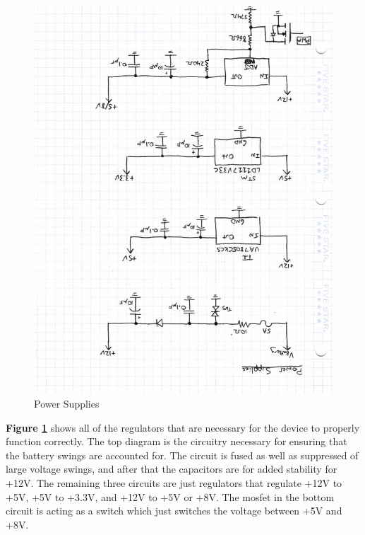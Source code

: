\documentclass[12pt,letterpaper]{article}
\begin{document}
\begin{figure}[H]
\centering
\includegraphics[page=1, totalheight=20cm, angle=180]{images/circuit_sch.pdf}
\caption{Power Supplies}
\label{fig:ps}
\end{figure}

\textbf{Figure \ref{fig:ps}} shows all of the regulators that are necessary for the device to properly function correctly. The top diagram is the circuitry necessary for ensuring that the battery swings are accounted for. The circuit is fused as well as suppressed of large voltage swings, and after that the capacitors are for added stability for +12V. The remaining three circuits are just regulators that regulate +12V to +5V, +5V to +3.3V, and +12V to +5V or +8V. The mosfet in the bottom circuit is acting as a switch which just switches the voltage between +5V and +8V.
\end{document}
